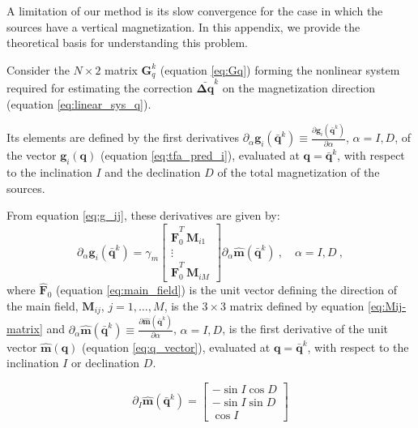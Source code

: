 \label{append:vertical-magnetization}

A limitation of our method is its slow convergence for the case in which the sources have
a vertical magnetization. In this appendix, we provide the theoretical basis for understanding 
this problem.

Consider the $N \times 2$ matrix $\mathbf{G}_{q}^{k}$ (equation \ref{eq:Gq}) forming the 
nonlinear system required for estimating the correction $\bar{\mathbf{\Delta q}}^{k}$ 
on the magnetization direction (equation \ref{eq:linear_sys_q}).

Its elements are defined by the first derivatives 
$\partial_{\alpha} \mathbf{g}_{i}(\bar{\mathbf{q}}^{k}) \equiv 
\frac{\partial \mathbf{g}_{i}(\bar{\mathbf{q}}^{k})}{\partial \alpha}$, $\alpha= I, D$, 
of the vector $\mathbf{g}_{i}(\mathbf{q})$ (equation \ref{eq:tfa_pred_i}), 
evaluated at $\mathbf{q} = \bar{\mathbf{q}}^{k}$, with respect to the 
inclination $I$ and the declination $D$ of the total magnetization of the sources.

From equation \ref{eq:g_ij}, these derivatives are given by:
\begin{equation}
\partial_{\alpha} \mathbf{g}_{i}(\bar{\mathbf{q}}^{k}) = 
\gamma_m  \begin{bmatrix}
\hat{\mathbf{F}}_{0}^T \, \mathbf{M}_{i1} \\
\vdots \\
\hat{\mathbf{F}}_{0}^T \, \mathbf{M}_{iM}
\end{bmatrix}
\partial_{\alpha} \hat{\mathbf{m}}(\bar{\mathbf{q}}^{k}) \: , \quad \alpha = I, D \: ,
\label{eq:D-alpha-gi}
\end{equation}
where $\hat{\mathbf{F}}_{0}$ (equation \ref{eq:main_field}) is the unit vector
defining the direction of the main field, $\mathbf{M}_{ij}$, $j = 1, \dots, M$,
is the $3 \times 3$ matrix defined by equation \ref{eq:Mij-matrix} and 
$\partial_{\alpha} \hat{\mathbf{m}}(\bar{\mathbf{q}}^{k}) \equiv 
\frac{\partial \hat{\mathbf{m}}(\bar{\mathbf{q}}^{k})}{\partial \alpha}$, $\alpha= I, D$, 
is the first derivative of the unit vector $\hat{\mathbf{m}}(\mathbf{q})$ (equation \ref{eq:q_vector}),
evaluated at $\mathbf{q} = \bar{\mathbf{q}}^{k}$, with respect to the inclination $I$ or declination $D$.

\begin{equation}
\partial_{I} \hat{\mathbf{m}}(\bar{\mathbf{q}}^{k}) = 
\begin{bmatrix}
	-\sin I \cos D \\
	-\sin I \sin D\\
	 \cos I
\end{bmatrix}
\label{eq:D_mag_vec_inc}
\end{equation}

